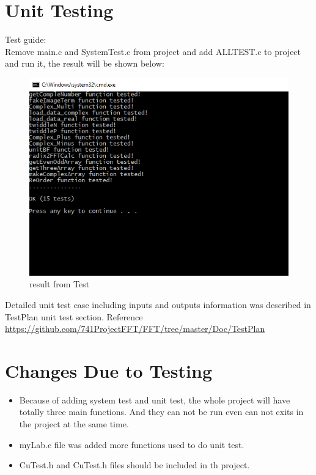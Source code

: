 \documentclass[12pt, titlepage]{article}
\begin{document}
\section{Unit Testing}
Test guide:\\
Remove main.c and SystemTest.c from project and add ALLTEST.c to project and run it, the result will be shown below:\\
\begin{figure}[H]
 \includegraphics[width=\linewidth]{test.PNG}
  \caption{result from Test}
  \label{fig:Test}
\end{figure}
Detailed unit test case including inputs and outputs information was described in TestPlan unit test section. Reference \url{https://github.com/741ProjectFFT/FFT/tree/master/Doc/TestPlan}

\section{Changes Due to Testing}
\begin{itemize}	
	\item Because of adding system test and unit test, the whole project will have totally three main functions. And they can not be run even can not exits in the project at the same time.
	\item  myLab.c file was added more functions used to do unit test.
	\item CuTest.h and CuTest.h files should be included in th project.

\end{itemize}	
\end{document}
